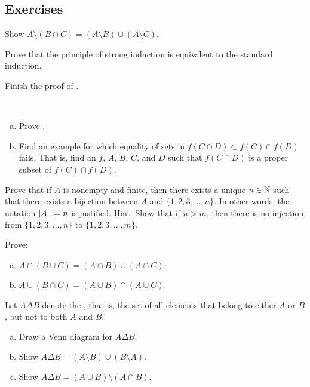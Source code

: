 \subsection{Exercises}

\begin{exercise}
Show
$A \setminus (B \cap C) = (A \setminus B) \cup (A \setminus C)$.
\end{exercise}

\begin{exercise}
Prove that the principle of strong induction is equivalent to the standard
induction.
\end{exercise}

\begin{exercise}
Finish the proof of .
\end{exercise}

\begin{exercise}
{\ }
\begin{enumerate}[a)]
\item
Prove .
\item
Find an example for which equality of sets
in 
$f( C \cap D) \subset f (C) \cap f (D)$
fails.  That is, find an $f$, $A$, $B$, $C$, and $D$ such that
$f( C \cap D)$ is a proper subset of $f(C) \cap f(D)$.
\end{enumerate}
\end{exercise}

\begin{exercise}[Tricky]
Prove that if $A$ is nonempty and finite, then there exists a unique
$n \in {\mathbb{N}}$ such
that there exists a bijection between $A$ and $\{ 1, 2, 3, \ldots, n \}$.
In other words, the notation $\left\lvert {A} \right\rvert := n$ is justified.
Hint: Show that if $n > m$, then there is no injection from
$\{ 1, 2, 3, \ldots, n \}$ to
$\{ 1, 2, 3, \ldots, m \}$.
\end{exercise}


\begin{exercise}
Prove:
\begin{enumerate}[a)]
\item $A \cap (B \cup C) = (A \cap B) \cup (A \cap C)$.
\item $A \cup (B \cap C) = (A \cup B) \cap (A \cup C)$.
\end{enumerate}
\end{exercise}

\begin{samepage}
\begin{exercise}
Let $A \Delta B$ denote the
\emph{}, that is, the set of all elements that
belong to either $A$ or $B$, but not to both $A$ and $B$.
\begin{enumerate}[a)]
\item
Draw a Venn diagram for
$A \Delta B$.
\item
Show $A \Delta B = (A \setminus B) \cup (B \setminus A)$.
\item
Show $A \Delta B = (A \cup B) \setminus ( A \cap B)$.
\end{enumerate}
\end{exercise}
\end{samepage}

